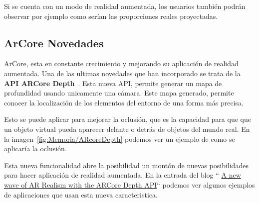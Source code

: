 Si se cuenta con un modo de realidad aumentada, los usuarios también podrán observar por ejemplo como serían las proporciones reales proyectadas.

\subsection{ArCore Novedades}
ArCore, esta en constante crecimiento y mejorando su aplicación de realidad aumentada. Una de las ultimas novedades que han incorporado se trata de la \textbf{API ARCore Depth}~\cite{apiArCoreDepth}. Esta nueva API, permite generar un mapa de profundidad usando unicamente una cámara. Este mapa generado, permite conocer la localización de los elementos del entorno de una forma más precisa.

Esto se puede aplicar para mejorar la oclusión, que es la capacidad para que que un objeto virtual pueda aparecer delante o detrás de objetos del mundo real. En la imagen~\ref{fig:Memoria/ARcoreDepth} podemos ver un ejemplo de como se aplicaría la oclusión.

Esta nueva funcionalidad abre la posibilidad un montón de nuevas posibilidades para hacer aplicación de realidad aumentada. En la entrada del blog `` \href{https://developers.googleblog.com/2020/06/a-new-wave-of-ar-realism-with-arcore-depth-api.html}{A new wave of AR Realism with the ARCore Depth API}`` podemos ver algunos ejemplos de aplicaciones que usan esta nueva caracteristica.


